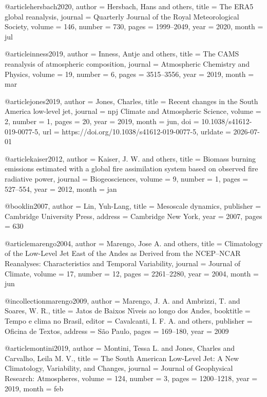 @article{hersbach2020,
	author  = {Hersbach, Hans and others},
	title   = {The ERA5 global reanalysis},
	journal = {Quarterly Journal of the Royal Meteorological Society},
	volume  = {146},
	number  = {730},
	pages   = {1999--2049},
	year    = {2020},
	month   = {jul}
}

@article{inness2019,
	author  = {Inness, Antje and others},
	title   = {The CAMS reanalysis of atmospheric composition},
	journal = {Atmospheric Chemistry and Physics},
	volume  = {19},
	number  = {6},
	pages   = {3515--3556},
	year    = {2019},
	month   = {mar}
}

@article{jones2019,
	author  = {Jones, Charles},
	title   = {Recent changes in the South America low-level jet},
	journal = {npj Climate and Atmospheric Science},
	volume  = {2},
	number  = {1},
	pages   = {20},
	year    = {2019},
	month   = {jun},
	doi     = {10.1038/s41612-019-0077-5},
	url     = {https://doi.org/10.1038/s41612-019-0077-5},
	urldate = {2026-07-01}
}

@article{kaiser2012,
	author  = {Kaiser, J. W. and others},
	title   = {Biomass burning emissions estimated with a global fire assimilation system based on observed fire radiative power},
	journal = {Biogeosciences},
	volume  = {9},
	number  = {1},
	pages   = {527--554},
	year    = {2012},
	month   = {jan}
}

@book{lin2007,
	author    = {Lin, Yuh-Lang},
	title     = {Mesoscale dynamics},
	publisher = {Cambridge University Press},
	address   = {Cambridge New York},
	year      = {2007},
	pages     = {630}
}

@article{marengo2004,
	author  = {Marengo, Jose A. and others},
	title   = {Climatology of the Low-Level Jet East of the Andes as Derived from the NCEP--NCAR Reanalyses: Characteristics and Temporal Variability},
	journal = {Journal of Climate},
	volume  = {17},
	number  = {12},
	pages   = {2261--2280},
	year    = {2004},
	month   = {jun}
}

@incollection{marengo2009,
	author    = {Marengo, J. A. and Ambrizzi, T. and Soares, W. R.},
	title     = {Jatos de Baixos N{\'\i}veis ao longo dos Andes},
	booktitle = {Tempo e clima no Brasil},
	editor    = {Cavalcanti, I. F. A. and others},
	publisher = {Oficina de Textos},
	address   = {S{\~a}o Paulo},
	pages     = {169--180},
	year      = {2009}
}

@article{montini2019,
	author  = {Montini, Tessa L. and Jones, Charles and Carvalho, Leila M. V.},
	title   = {The South American Low-Level Jet: A New Climatology, Variability, and Changes},
	journal = {Journal of Geophysical Research: Atmospheres},
	volume  = {124},
	number  = {3},
	pages   = {1200--1218},
	year    = {2019},
	month   = {feb}
}

